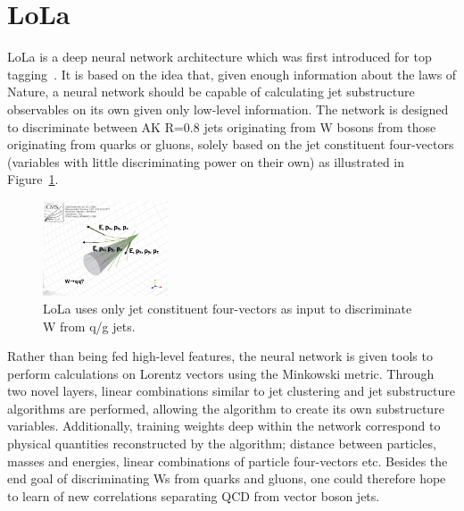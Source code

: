 \section{LoLa}
LoLa is a deep neural network architecture which was first introduced for top tagging~\cite{Butter:2017cot}. It is based on the idea that, given enough information about the laws of Nature, a neural network should be capable of calculating jet substructure observables on its own given only low-level information. The network is designed to discriminate between AK R=0.8 jets originating from W bosons from those originating from quarks or gluons, solely based on the jet constituent four-vectors (variables with little discriminating power on their own) as illustrated in Figure~\ref{fig:lola:4vec}.
\begin{figure}[h!]
\centering
\includegraphics[width=0.33\textwidth]{figures/vtagging/misc/4vec.png}
\caption{LoLa uses only jet constituent four-vectors as input to discriminate W from q/g jets.}
\label{fig:lola:4vec}
\end{figure}
Rather than being fed high-level features, the neural network is given tools to perform calculations on Lorentz vectors using the Minkowski metric. Through two novel layers, linear combinations similar to jet clustering and jet substructure algorithms are performed, allowing the algorithm to create its own substructure variables. Additionally, training weights deep within the network correspond to physical quantities reconstructed by the algorithm; distance between particles, masses and energies, linear combinations of particle four-vectors etc.
Besides the end goal of discriminating Ws from quarks and gluons, one could therefore hope to learn of new correlations separating QCD from vector boson jets.

